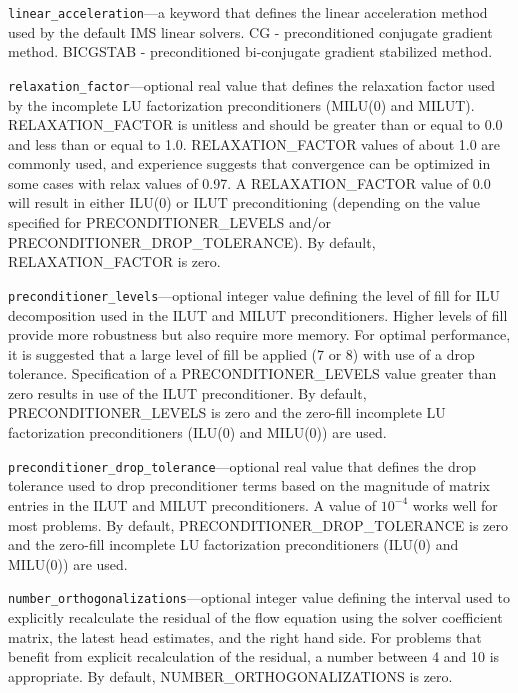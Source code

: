 \begin{description}
\item \texttt{linear\_acceleration}---a keyword that defines the linear acceleration method used by the default IMS linear solvers.  CG - preconditioned conjugate gradient method.  BICGSTAB - preconditioned bi-conjugate gradient stabilized method.

\item \texttt{relaxation\_factor}---optional real value that defines the relaxation factor used by the incomplete LU factorization preconditioners (MILU(0) and MILUT). RELAXATION\_FACTOR is unitless and should be greater than or equal to 0.0 and less than or equal to 1.0. RELAXATION\_FACTOR values of about 1.0 are commonly used, and experience suggests that convergence can be optimized in some cases with relax values of 0.97. A RELAXATION\_FACTOR value of 0.0 will result in either ILU(0) or ILUT preconditioning (depending on the value specified for PRECONDITIONER\_LEVELS and/or PRECONDITIONER\_DROP\_TOLERANCE). By default,  RELAXATION\_FACTOR is zero.

\item \texttt{preconditioner\_levels}---optional integer value defining the level of fill for ILU decomposition used in the ILUT and MILUT preconditioners. Higher levels of fill provide more robustness but also require more memory. For optimal performance, it is suggested that a large level of fill be applied (7 or 8) with use of a drop tolerance. Specification of a PRECONDITIONER\_LEVELS value greater than zero results in use of the ILUT preconditioner. By default, PRECONDITIONER\_LEVELS is zero and the zero-fill incomplete LU factorization preconditioners (ILU(0) and MILU(0)) are used.

\item \texttt{preconditioner\_drop\_tolerance}---optional real value that defines the drop tolerance used to drop preconditioner terms based on the magnitude of matrix entries in the ILUT and MILUT preconditioners. A value of $10^{-4}$ works well for most problems. By default, PRECONDITIONER\_DROP\_TOLERANCE is zero and the zero-fill incomplete LU factorization preconditioners (ILU(0) and MILU(0)) are used.

\item \texttt{number\_orthogonalizations}---optional integer value defining the interval used to explicitly recalculate the residual of the flow equation using the solver coefficient matrix, the latest head estimates, and the right hand side. For problems that benefit from explicit recalculation of the residual, a number between 4 and 10 is appropriate. By default, NUMBER\_ORTHOGONALIZATIONS is zero.


\end{description}
